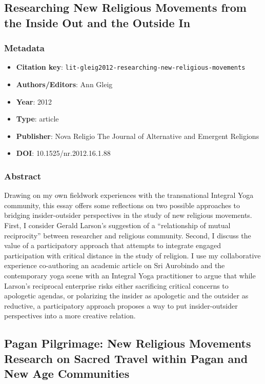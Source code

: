 \subsection{Researching New Religious Movements from the Inside Out and the Outside In}\label{lit:lit-gleig2012-researching-new-religious-movements}
\subsubsection*{Metadata}
\begin{itemize}
  \item \textbf{Citation key}: \texttt{lit-gleig2012-researching-new-religious-movements}
  \item \textbf{Authors/Editors}: Ann Gleig
  \item \textbf{Year}: 2012
  \item \textbf{Type}: article
  \item \textbf{Publisher}: Nova Religio The Journal of Alternative and Emergent Religions
  \item \textbf{DOI}: 10.1525/nr.2012.16.1.88
\end{itemize}
\subsubsection*{Abstract}
Drawing on my own fieldwork experiences with the transnational Integral Yoga community, this essay offers some reflections on two possible approaches to bridging insider-outsider perspectives in the study of new religious movements. First, I consider Gerald Larson's suggestion of a “relationship of mutual reciprocity” between researcher and religious community. Second, I discuss the value of a participatory approach that attempts to integrate engaged participation with critical distance in the study of religion. I use my collaborative experience co-authoring an academic article on Sri Aurobindo and the contemporary yoga scene with an Integral Yoga practitioner to argue that while Larson's reciprocal enterprise risks either sacrificing critical concerns to apologetic agendas, or polarizing the insider as apologetic and the outsider as reductive, a participatory approach proposes a way to put insider-outsider perspectives into a more creative relation.

\subsection{Pagan Pilgrimage: New Religious Movements Research on Sacred Travel within Pagan and New Age Communities}\label{lit:lit-zwissler2011-pagan-pilgrimage-new-religious}
